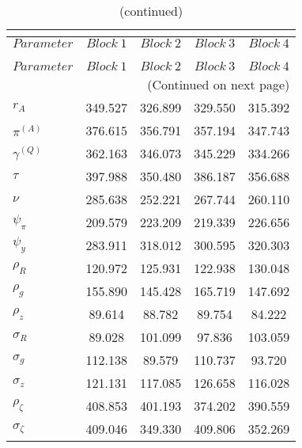  
\begin{center}
\begin{longtable}{lcccc} 
\caption{MCMC Inefficiency factors per block}\\
 \label{Table:MCMC_inefficiency_factors}\\
\toprule 
$Parameter         $	 & 	 $     Block~1$	 & 	 $     Block~2$	 & 	 $     Block~3$	 & 	 $     Block~4$\\
\midrule \endfirsthead 
\caption{(continued)}\\
 \toprule \\ 
$Parameter         $	 & 	 $     Block~1$	 & 	 $     Block~2$	 & 	 $     Block~3$	 & 	 $     Block~4$\\
\midrule \endhead 
\midrule \multicolumn{5}{r}{(Continued on next page)} \\ \bottomrule \endfoot 
\bottomrule \endlastfoot 
$ {r_{A}}          $	 & 	     349.527	 & 	     326.899	 & 	     329.550	 & 	     315.392 \\ 
$ {\pi^{(A)}}      $	 & 	     376.615	 & 	     356.791	 & 	     357.194	 & 	     347.743 \\ 
$ {\gamma^{(Q)}}   $	 & 	     362.163	 & 	     346.073	 & 	     345.229	 & 	     334.266 \\ 
$ {\tau}           $	 & 	     397.988	 & 	     350.480	 & 	     386.187	 & 	     356.688 \\ 
$ {\nu}            $	 & 	     285.638	 & 	     252.221	 & 	     267.744	 & 	     260.110 \\ 
$ {\psi_\pi}       $	 & 	     209.579	 & 	     223.209	 & 	     219.339	 & 	     226.656 \\ 
$ {\psi_y}         $	 & 	     283.911	 & 	     318.012	 & 	     300.595	 & 	     320.303 \\ 
$ {\rho_R}         $	 & 	     120.972	 & 	     125.931	 & 	     122.938	 & 	     130.048 \\ 
$ {\rho_{g}}       $	 & 	     155.890	 & 	     145.428	 & 	     165.719	 & 	     147.692 \\ 
$ {\rho_z}         $	 & 	      89.614	 & 	      88.782	 & 	      89.754	 & 	      84.222 \\ 
$ {\sigma_R}       $	 & 	      89.028	 & 	     101.099	 & 	      97.836	 & 	     103.059 \\ 
$ {\sigma_{g}}     $	 & 	     112.138	 & 	      89.579	 & 	     110.737	 & 	      93.720 \\ 
$ {\sigma_z}       $	 & 	     121.131	 & 	     117.085	 & 	     126.658	 & 	     116.028 \\ 
$ {\rho_\zeta}     $	 & 	     408.853	 & 	     401.193	 & 	     374.202	 & 	     390.559 \\ 
$ {\sigma_\zeta}   $	 & 	     409.046	 & 	     349.330	 & 	     409.806	 & 	     352.269 \\ 
\end{longtable}
 \end{center}
